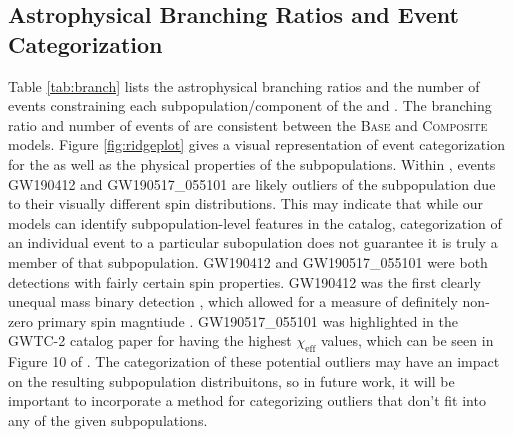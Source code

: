 \subsection{Astrophysical Branching Ratios and Event Categorization}

Table \ref{tab:branch} lists the astrophysical branching ratios and the number of events constraining each subpopulation/component of the \base{} and \comp{}. The branching ratio and number of events of \first{} are consistent between the \textsc{Base} and \textsc{Composite} models. Figure \ref{fig:ridgeplot} gives a visual representation of event categorization for the \comp{} as well as the physical properties of the subpopulations. Within \contA{}, events GW190412 and GW190517\_055101 are likely outliers of the subpopulation due to their visually different spin distributions. This may indicate that while our models can identify subpopulation-level features in the catalog, categorization of an individual event to a particular subopulation does not guarantee it is truly a member of that subpopulation. GW190412 and GW190517\_055101 were both detections with fairly certain spin properties. GW190412 was the first clearly unequal mass binary detection , which allowed for a measure of definitely non-zero primary spin magntiude . GW190517\_055101 was highlighted in the GWTC-2 catalog paper  for having the highest $\chi_\text{eff}$ values, which can be seen in Figure 10 of . The categorization of these potential outliers may have an impact on the resulting subpopulation distribuitons, so in future work, it will be important to incorporate a method for categorizing outliers that don't fit into any of the given subpopulations. 


